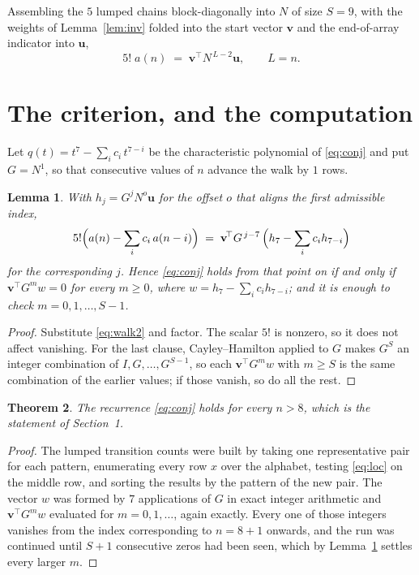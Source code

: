 \documentclass[11pt,a4paper]{article}
\theoremstyle{plain}
\newtheorem{theorem}{Theorem}
\newtheorem{lemma}[theorem]{Lemma}
\theoremstyle{definition}
\begin{document}
Assembling the $5$ lumped chains block-diagonally into $N$ of size $S=9$, with the
weights of Lemma~\ref{lem:inv} folded into the start vector $\mathbf{v}$ and the
end-of-array indicator into $\mathbf{u}$,
\begin{equation}\label{eq:walk2}
5!\;a(n)\;=\;\mathbf{v}^{\!\top}N^{\,L-2}\mathbf{u},\qquad L=n .
\end{equation}

\section{The criterion, and the computation}

Let $q(t)=t^{7}-\sum_i c_i\,t^{7-i}$ be the characteristic polynomial of
\eqref{eq:conj} and put $G=N^{1}$, so that consecutive values of $n$ advance the
walk by $1$ rows.

\begin{lemma}\label{lem:crit}
With $h_j=G^{j}N^{o}\mathbf{u}$ for the offset $o$ that aligns the first admissible
index,
\[
5!\Bigl(a(n)-\sum_i c_i\,a(n-i)\Bigr)\;=\;\mathbf{v}^{\!\top}G^{\,j-7}\,
\Bigl(h_{7}-\sum_i c_i h_{7-i}\Bigr)
\]
for the corresponding $j$. Hence \eqref{eq:conj} holds from that point on if and only if
$\mathbf{v}^{\!\top}G^{m}w=0$ for every $m\ge0$, where
$w=h_{7}-\sum_i c_ih_{7-i}$; and it is enough to check $m=0,1,\dots,S-1$.
\end{lemma}

\begin{proof}
Substitute \eqref{eq:walk2} and factor. The scalar $5!$ is nonzero, so it does not
affect vanishing. For the last clause, Cayley--Hamilton applied to $G$ makes $G^{S}$ an
integer combination of $I,G,\dots,G^{S-1}$, so each $\mathbf{v}^{\!\top}G^{m}w$ with
$m\ge S$ is the same combination of the earlier values; if those vanish, so do all the rest.
\end{proof}

\begin{theorem}
The recurrence \eqref{eq:conj} holds for every $n>8$, which is the statement of
Section~1.
\end{theorem}

\begin{proof}
The lumped transition counts were built by taking one representative pair for each pattern,
enumerating every row $x$ over the alphabet, testing \eqref{eq:loc} on the middle
row, and sorting the results by the pattern of the new pair. The vector $w$ was formed by
$7$ applications of $G$ in exact integer arithmetic and $\mathbf{v}^{\!\top}G^{m}w$
evaluated for $m=0,1,\dots$, again exactly. Every one of those integers vanishes from the
index corresponding to $n=8+1$ onwards, and the run was continued until $S+1$
consecutive zeros had been seen, which by Lemma~\ref{lem:crit} settles every larger $m$.
\end{proof}
\end{document}
